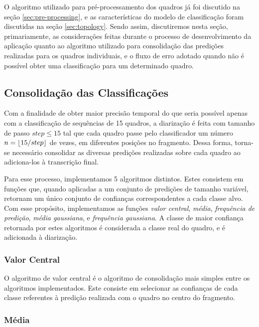 O algoritmo utilizado para pré-processamento dos quadros já foi discutido na seção \ref{sec:pre-processing}, e as características do modelo de classificação foram discutidas na seção \ref{sec:topology}.
Sendo assim, discutiremos nesta seção, primariamente, as considerações feitas durante o processo de desenvolvimento da aplicação quanto ao algoritmo utilizado para consolidação das predições realizadas para os quadros individuais, e o fluxo de erro adotado quando não é possível obter uma classificação para um determinado quadro.

\subsection{Consolidação das Classificações}
\label{sec:class-commit}

Com a finalidade de obter maior precisão temporal do que seria possível apenas com a classificação de sequências de 15 quadros, a diarização é feita com tamanho de passo $step \leq 15$ tal que cada quadro passe pelo classificador um número $n = \left\lfloor 15 / step \right\rfloor$ de vezes, em diferentes posições no fragmento.
Dessa forma, torna-se necessário consolidar as diversas predições realizadas sobre cada quadro ao adiciona-los à transcrição final.

Para esse processo, implementamos 5 algoritmos distintos. 
Estes consistem em funções que, quando aplicadas a um conjunto de predições de tamanho variável, retornam um único conjunto de confianças correspondentes a cada classe alvo.
Com esse propósito, implementamos as funções \textit{valor central}, \textit{média}, \textit{frequência de predição}, \textit{média gaussiana}, e \textit{frequência gaussiana}.
A classe de maior confiança retornada por estes algoritmos é considerada a classe real do quadro, e é adicionada à diarização.

\subsubsection{Valor Central}

O algoritmo de valor central é o algoritmo de consolidação mais simples entre os algoritmos implementados.
Este consiste em selecionar as confianças de cada classe referentes à predição realizada com o quadro no centro do fragmento.

\subsubsection{Média}

